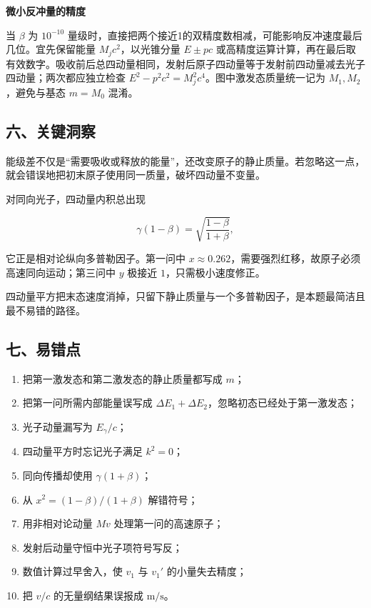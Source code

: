 \documentclass[12pt,a4paper,UTF8]{ctexart}
\newcommand{\tightlist}{\setlength{\itemsep}{0pt}\setlength{\parskip}{0pt}}
\begin{document}
\textbf{微小反冲量的精度}

当 \(\beta\) 为 \(10^{-10}\)
量级时，直接把两个接近1的双精度数相减，可能影响反冲速度最后几位。宜先保留能量
\(M_jc^2\)，以光锥分量 \(E\pm pc\)
或高精度运算计算，再在最后取有效数字。吸收前后总四动量相同，发射后原子四动量等于发射前四动量减去光子四动量；两次都应独立检查
\(E^2-p^2c^2=M_j^2c^4\)。图中激发态质量统一记为 \(M_1,M_2\)，避免与基态
\(m=M_0\) 混淆。

\subsection{六、关键洞察}\label{ux516dux5173ux952eux6d1eux5bdf-7}

能级差不仅是``需要吸收或释放的能量''，还改变原子的静止质量。若忽略这一点，就会错误地把初末原子使用同一质量，破坏四动量不变量。

对同向光子，四动量内积总出现

\[
\gamma(1-\beta)
=\sqrt{\frac{1-\beta}{1+\beta}},
\]

它正是相对论纵向多普勒因子。第一问中
\(x\approx0.262\)，需要强烈红移，故原子必须高速同向运动；第三问中 \(y\)
极接近 \(1\)，只需极小速度修正。

四动量平方把末态速度消掉，只留下静止质量与一个多普勒因子，是本题最简洁且最不易错的路径。

\subsection{七、易错点}\label{ux4e03ux6613ux9519ux70b9-7}

\begin{enumerate}
\def\labelenumi{\arabic{enumi}.}
\tightlist
\item
  把第一激发态和第二激发态的静止质量都写成 \(m\)；
\item
  把第一问所需内部能量误写成
  \(\Delta E_1+\Delta E_2\)，忽略初态已经处于第一激发态；
\item
  光子动量漏写为 \(E_\gamma/c\)；
\item
  四动量平方时忘记光子满足 \(k^2=0\)；
\item
  同向传播却使用 \(\gamma(1+\beta)\)；
\item
  从 \(x^2=(1-\beta)/(1+\beta)\) 解错符号；
\item
  用非相对论动量 \(Mv\) 处理第一问的高速原子；
\item
  发射后动量守恒中光子项符号写反；
\item
  数值计算过早舍入，使 \(v_1\) 与 \(v_1'\) 的小量失去精度；
\item
  把 \(v/c\) 的无量纲结果误报成 \(\mathrm{m/s}\)。
\end{enumerate}
\end{document}
